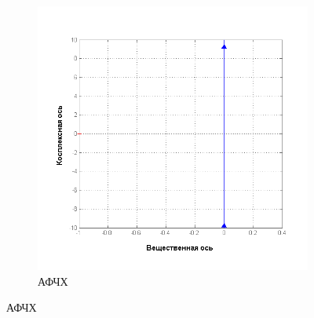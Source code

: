 \documentclass[a4paper, 11pt, russian]{article}
\begin{document}
\begin{figure}[ht!]
\begin{subfigure}[h]{0.49\textwidth}
            \includegraphics[width = \textwidth]{integratingLinkNyquist}
            \caption{АФЧХ}
        \end{subfigure}
        

\end{figure}
\end{document}
